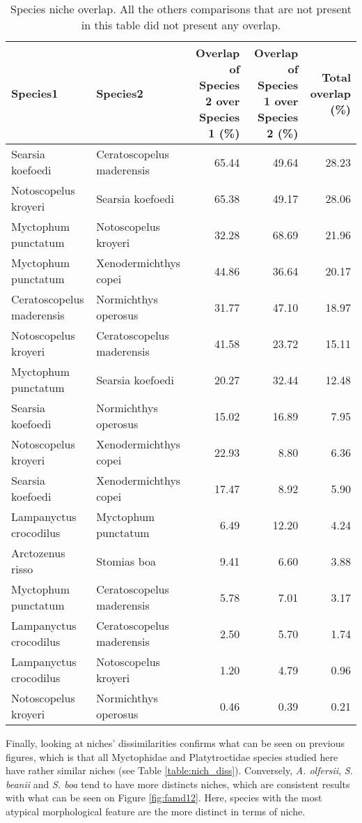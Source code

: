 \begin{table}[!htbp]
\centering
\caption{Species niche overlap. All the others comparisons that are not present in this table did not present any overlap.}
\label{table:ell_ovlp}
\begin{adjustbox}{max width=1.1\textwidth,center}
\begin{tabular}{llrrr}
  \hline
Species1 & Species2 & Overlap of Species 2 over Species 1 (\%) & Overlap of Species 1 over Species 2 (\%) & Total overlap (\%)\\ 
  \hline
Searsia koefoedi & Ceratoscopelus maderensis & 65.44 & 49.64 & 28.23 \\ 
  Notoscopelus kroyeri & Searsia koefoedi & 65.38 & 49.17 & 28.06 \\ 
  Myctophum punctatum & Notoscopelus kroyeri & 32.28 & 68.69 & 21.96 \\ 
  Myctophum punctatum & Xenodermichthys copei & 44.86 & 36.64 & 20.17 \\ 
  Ceratoscopelus maderensis & Normichthys operosus & 31.77 & 47.10 & 18.97 \\ 
  Notoscopelus kroyeri & Ceratoscopelus maderensis & 41.58 & 23.72 & 15.11 \\ 
  Myctophum punctatum & Searsia koefoedi & 20.27 & 32.44 & 12.48 \\ 
  Searsia koefoedi & Normichthys operosus & 15.02 & 16.89 & 7.95 \\ 
  Notoscopelus kroyeri & Xenodermichthys copei & 22.93 & 8.80 & 6.36 \\ 
  Searsia koefoedi & Xenodermichthys copei & 17.47 & 8.92 & 5.90 \\ 
  Lampanyctus crocodilus & Myctophum punctatum & 6.49 & 12.20 & 4.24 \\ 
  Arctozenus risso & Stomias boa & 9.41 & 6.60 & 3.88 \\ 
  Myctophum punctatum & Ceratoscopelus maderensis & 5.78 & 7.01 & 3.17 \\ 
  Lampanyctus crocodilus & Ceratoscopelus maderensis & 2.50 & 5.70 & 1.74 \\ 
  Lampanyctus crocodilus & Notoscopelus kroyeri & 1.20 & 4.79 & 0.96 \\ 
  Notoscopelus kroyeri & Normichthys operosus & 0.46 & 0.39 & 0.21 \\ 
   \hline
\end{tabular}
\end{adjustbox}
\end{table}

Finally, looking at niches' dissimilarities confirms what can be seen on previous figures, which is that all Myctophidae and Platytroctidae species studied here have rather similar niches (see Table \ref{table:nich_diss}). Conversely, \textit{A. olfersii}, \textit{S. beanii} and \textit{S. boa} tend to have more distincts niches, which are consistent results with what can be seen on Figure \ref{fig:famd12}. Here, species with the most atypical morphological feature are the more distinct in terms of niche. 

